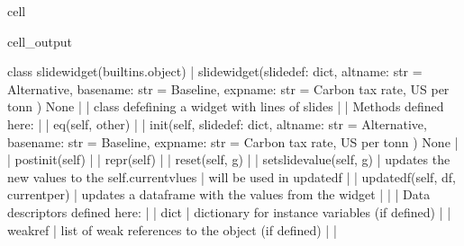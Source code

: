 \documentclass[letterpaper,10pt,english]{jupyterBook}
\begin{document}
\begin{sphinxuseclass}{cell}
\begin{sphinxVerbatimOutput}
\begin{sphinxuseclass}{cell_output}
\begin{sphinxVerbatim}[commandchars=\\\{\}]
    class slidewidget(builtins.object)
     |  slidewidget(slidedef: dict, altname: str = \PYGZsq{}Alternative\PYGZsq{}, basename: str = \PYGZsq{}Baseline\PYGZsq{}, expname: str = \PYGZsq{}Carbon tax rate, US\PYGZdl{} per tonn \PYGZsq{}) \PYGZhy{}\PYGZgt{} None
     |  
     |  class defefining a widget with lines of slides
     |  
     |  Methods defined here:
     |  
     |  \PYGZus{}\PYGZus{}eq\PYGZus{}\PYGZus{}(self, other)
     |  
     |  \PYGZus{}\PYGZus{}init\PYGZus{}\PYGZus{}(self, slidedef: dict, altname: str = \PYGZsq{}Alternative\PYGZsq{}, basename: str = \PYGZsq{}Baseline\PYGZsq{}, expname: str = \PYGZsq{}Carbon tax rate, US\PYGZdl{} per tonn \PYGZsq{}) \PYGZhy{}\PYGZgt{} None
     |  
     |  \PYGZus{}\PYGZus{}post\PYGZus{}init\PYGZus{}\PYGZus{}(self)
     |  
     |  \PYGZus{}\PYGZus{}repr\PYGZus{}\PYGZus{}(self)
     |  
     |  reset(self, g)
     |  
     |  set\PYGZus{}slide\PYGZus{}value(self, g)
     |      updates the new values to the self.current\PYGZus{}vlues
     |      will be used in update\PYGZus{}df
     |  
     |  update\PYGZus{}df(self, df, current\PYGZus{}per)
     |      updates a dataframe with the values from the widget
     |  
     |  \PYGZhy{}\PYGZhy{}\PYGZhy{}\PYGZhy{}\PYGZhy{}\PYGZhy{}\PYGZhy{}\PYGZhy{}\PYGZhy{}\PYGZhy{}\PYGZhy{}\PYGZhy{}\PYGZhy{}\PYGZhy{}\PYGZhy{}\PYGZhy{}\PYGZhy{}\PYGZhy{}\PYGZhy{}\PYGZhy{}\PYGZhy{}\PYGZhy{}\PYGZhy{}\PYGZhy{}\PYGZhy{}\PYGZhy{}\PYGZhy{}\PYGZhy{}\PYGZhy{}\PYGZhy{}\PYGZhy{}\PYGZhy{}\PYGZhy{}\PYGZhy{}\PYGZhy{}\PYGZhy{}\PYGZhy{}\PYGZhy{}\PYGZhy{}\PYGZhy{}\PYGZhy{}\PYGZhy{}\PYGZhy{}\PYGZhy{}\PYGZhy{}\PYGZhy{}\PYGZhy{}\PYGZhy{}\PYGZhy{}\PYGZhy{}\PYGZhy{}\PYGZhy{}\PYGZhy{}\PYGZhy{}\PYGZhy{}\PYGZhy{}\PYGZhy{}\PYGZhy{}\PYGZhy{}\PYGZhy{}\PYGZhy{}\PYGZhy{}\PYGZhy{}\PYGZhy{}\PYGZhy{}\PYGZhy{}\PYGZhy{}\PYGZhy{}\PYGZhy{}\PYGZhy{}
     |  Data descriptors defined here:
     |  
     |  \PYGZus{}\PYGZus{}dict\PYGZus{}\PYGZus{}
     |      dictionary for instance variables (if defined)
     |  
     |  \PYGZus{}\PYGZus{}weakref\PYGZus{}\PYGZus{}
     |      list of weak references to the object (if defined)
     |  
     |  \PYGZhy{}\PYGZhy{}\PYGZhy{}\PYGZhy{}\PYGZhy{}\PYGZhy{}\PYGZhy{}\PYGZhy{}\PYGZhy{}\PYGZhy{}\PYGZhy{}\PYGZhy{}\PYGZhy{}\PYGZhy{}\PYGZhy{}\PYGZhy{}\PYGZhy{}\PYGZhy{}\PYGZhy{}\PYGZhy{}\PYGZhy{}\PYGZhy{}\PYGZhy{}\PYGZhy{}\PYGZhy{}\PYGZhy{}\PYGZhy{}\PYGZhy{}\PYGZhy{}\PYGZhy{}\PYGZhy{}\PYGZhy{}\PYGZhy{}\PYGZhy{}\PYGZhy{}\PYGZhy{}\PYGZhy{}\PYGZhy{}\PYGZhy{}\PYGZhy{}\PYGZhy{}\PYGZhy{}\PYGZhy{}\PYGZhy{}\PYGZhy{}\PYGZhy{}\PYGZhy{}\PYGZhy{}\PYGZhy{}\PYGZhy{}\PYGZhy{}\PYGZhy{}\PYGZhy{}\PYGZhy{}\PYGZhy{}\PYGZhy{}\PYGZhy{}\PYGZhy{}\PYGZhy{}\PYGZhy{}\PYGZhy{}\PYGZhy{}\PYGZhy{}\PYGZhy{}\PYGZhy{}\PYGZhy{}\PYGZhy{}\PYGZhy{}\PYGZhy{}\PYGZhy{}

\end{sphinxVerbatim}
\end{sphinxuseclass}
\end{sphinxVerbatimOutput}
\end{sphinxuseclass}
\end{document}
